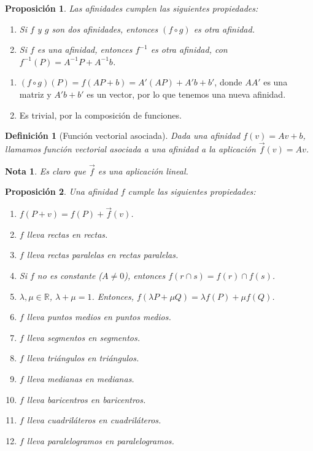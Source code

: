 \documentclass[11pt, a4paper]{article}
\makeatletter
\newif\IfInSansMode
\let\oldsf\sffamily
\renewcommand*{\sffamily}{\oldsf\mathversion{sans}\InSansModetrue}
\let\oldnorm\normalfont
\renewcommand*{\normalfont}{\oldnorm\InSansModefalse\mathversion{normal}}
\renewenvironment{proof}[1][\proofname] {\vspace{-15pt}\par\pushQED{\qed}\normalfont\topsep6\p@\@plus6\p@\relax\trivlist\item[\hskip\labelsep\it#1\@addpunct{.}]\ignorespaces}{\popQED\endtrivlist\@endpefalse}
\newcommand{\R}{\mathbb{R}}
\renewcommand{\vec}{\overrightarrow}
\renewenvironment{proof}[1][\proofname] {\par\pushQED{\qed}\normalfont\topsep6\p@\@plus6\p@\relax\trivlist\item[\hskip\labelsep\itshape\sffamily#1\@addpunct{.}]\ignorespaces}{\popQED\endtrivlist\@endpefalse}
\theoremstyle{theorem-style}
\newtheorem{nprop}{Proposición}[section]
\theoremstyle{definition-style}
\newtheorem{ndef}{Definición}[section]
\theoremstyle{remark-style}
\newtheorem*{nota}{Nota}
\theoremstyle{example-style}
\newenvironment{nlist}
{\begin{enumerate}
    \renewcommand\labelenumi{(\emph{\roman{enumi})}}}
  {\end{enumerate}}
\makeatother
\begin{document}
\begin{nprop}
  Las afinidades cumplen las siguientes propiedades:
  \begin{nlist}
    \item Si $f$ y $g$ son dos afinidades, entonces $(f \circ g)$ es otra afinidad.
    \item Si $f$ es una afinidad, entonces  $f^{-1}$ es otra afinidad, con $f^{-1}(P) = A^{-1}P +A^{-1}b$.
  \end{nlist}
\end{nprop}
\begin{proof}\hfill
  \begin{nlist}
  \item $(f\circ g)(P) = f(AP +b) = A'(AP)+A'b +b' $, donde $AA'$ es una matriz y $A'b+b'$ es un vector, por lo que tenemos una nueva afinidad.
  \item Es trivial, por la composición de funciones.
  \end{nlist}
\end{proof}

\begin{ndef}[Función vectorial asociada]
  Dada una afinidad $f(v) = Av + b$, llamamos función vectorial asociada a una afinidad a la aplicación $\vec{f}(v) = Av$.
\end{ndef}

\begin{nota}
	Es claro que $\vec{f}$ es una aplicación lineal.
\end{nota}

\begin{nprop}
Una afinidad $f$ cumple las siguientes propiedades:
  \begin{nlist}
    \item $f(P + v) = f(P) + \vec{f}(v)$.
\item $f$ lleva rectas en rectas.
\item $f$ lleva rectas paralelas en rectas paralelas.
\item Si $f$ no es constante ($A \ne 0$), entonces $f(r\cap s) = f(r) \cap f(s)$.
\item $\lambda,\mu \in \R$, $\lambda+\mu=1$. Entonces, $f(\lambda P + \mu Q) = \lambda f(P) +  \mu f(Q)$.
\item $f$ lleva puntos medios en puntos medios.
\item $f$ lleva segmentos en segmentos.
\item $f$ lleva triángulos en triángulos.
\item $f$ lleva medianas en medianas.
\item $f$ lleva baricentros en baricentros.
\item $f$ lleva cuadriláteros en cuadriláteros.
\item $f$ lleva paralelogramos en paralelogramos.
  \end{nlist}
\end{nprop}
\end{document}
